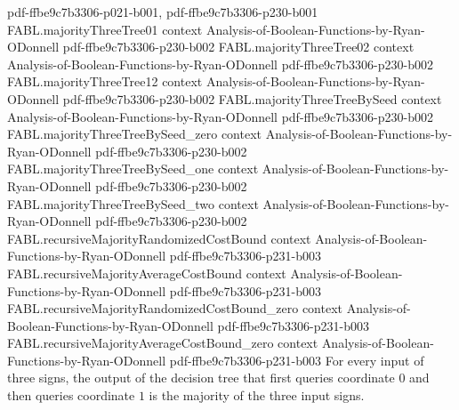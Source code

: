 \begin{theorem}
  {pdf-ffbe9c7b3306-p021-b001,
    pdf-ffbe9c7b3306-p230-b001}
\proofstep
  {FABL.majorityThreeTree01}
  {context}
  {Analysis-of-Boolean-Functions-by-Ryan-ODonnell}
  {pdf-ffbe9c7b3306-p230-b002}
\proofstep
  {FABL.majorityThreeTree02}
  {context}
  {Analysis-of-Boolean-Functions-by-Ryan-ODonnell}
  {pdf-ffbe9c7b3306-p230-b002}
\proofstep
  {FABL.majorityThreeTree12}
  {context}
  {Analysis-of-Boolean-Functions-by-Ryan-ODonnell}
  {pdf-ffbe9c7b3306-p230-b002}
\proofstep
  {FABL.majorityThreeTreeBySeed}
  {context}
  {Analysis-of-Boolean-Functions-by-Ryan-ODonnell}
  {pdf-ffbe9c7b3306-p230-b002}
\proofstep
  {FABL.majorityThreeTreeBySeed_zero}
  {context}
  {Analysis-of-Boolean-Functions-by-Ryan-ODonnell}
  {pdf-ffbe9c7b3306-p230-b002}
\proofstep
  {FABL.majorityThreeTreeBySeed_one}
  {context}
  {Analysis-of-Boolean-Functions-by-Ryan-ODonnell}
  {pdf-ffbe9c7b3306-p230-b002}
\proofstep
  {FABL.majorityThreeTreeBySeed_two}
  {context}
  {Analysis-of-Boolean-Functions-by-Ryan-ODonnell}
  {pdf-ffbe9c7b3306-p230-b002}
\proofstep
  {FABL.recursiveMajorityRandomizedCostBound}
  {context}
  {Analysis-of-Boolean-Functions-by-Ryan-ODonnell}
  {pdf-ffbe9c7b3306-p231-b003}
\proofstep
  {FABL.recursiveMajorityAverageCostBound}
  {context}
  {Analysis-of-Boolean-Functions-by-Ryan-ODonnell}
  {pdf-ffbe9c7b3306-p231-b003}
\proofstep
  {FABL.recursiveMajorityRandomizedCostBound_zero}
  {context}
  {Analysis-of-Boolean-Functions-by-Ryan-ODonnell}
  {pdf-ffbe9c7b3306-p231-b003}
\proofstep
  {FABL.recursiveMajorityAverageCostBound_zero}
  {context}
  {Analysis-of-Boolean-Functions-by-Ryan-ODonnell}
  {pdf-ffbe9c7b3306-p231-b003}
For every input of three signs, the output of the decision tree that first queries
coordinate $0$ and then queries coordinate $1$ is the majority of the three input signs.
\end{theorem}

